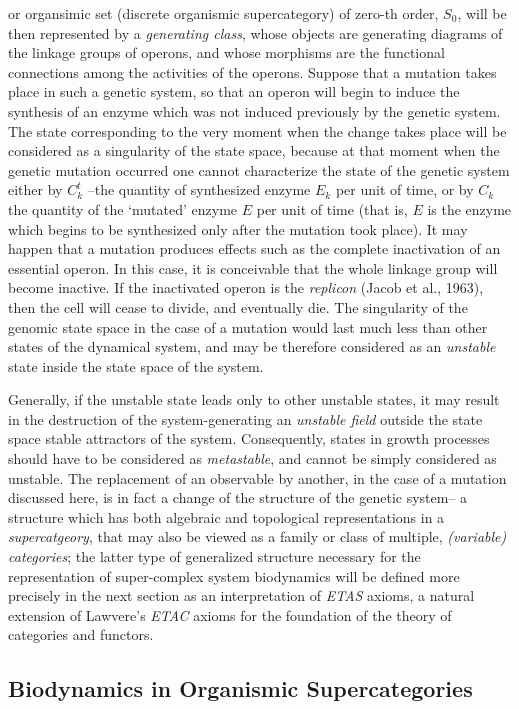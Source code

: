 \documentclass[12pt]{article}
\theoremstyle{plain}
\theoremstyle{definition}
\numberwithin{equation}{section}
\newcommand{\<}{{\langle}}
\begin{document}
or organsimic set (discrete organismic supercategory) of zero-th order, $S_0$, will be then represented by a \emph{generating class}, whose objects are generating diagrams of the linkage groups of operons, and whose morphisms are the functional connections among the activities of the operons. Suppose that a mutation takes place in such a genetic system, so that an operon will begin to induce the synthesis of an enzyme which was not induced previously by the genetic system. The state corresponding to the very moment when the change takes place will be considered as a singularity of the state space, because at that moment when the genetic mutation occurred one cannot characterize the state of the genetic system either by $C^t_k$ --the quantity of synthesized enzyme $E_k$ per unit of time, or by $C_k$ the quantity of the `mutated' enzyme $E$  per unit of time (that is, $E$  is the enzyme which begins to be synthesized only after the mutation took place). It may happen that a mutation produces effects such as the complete inactivation of an essential operon. In this case, it is conceivable that the whole linkage group will become inactive.  If the inactivated operon is the \emph{replicon} (Jacob et al., 1963), then the cell will cease to divide, and eventually die. The singularity of the genomic state space in the case of a mutation would last much less than other states of the dynamical system, and may be therefore considered as an \emph{unstable} state inside the state space of the system.

Generally, if the unstable state leads only to other unstable states, it may result in the destruction of the system-generating an \emph{unstable field} outside the state space stable attractors of the system. Consequently, states in growth processes should have to be considered as \emph{metastable}, and cannot be simply considered as unstable. The replacement of an observable by another, in the case of a mutation discussed here, is in fact a change of the structure of the genetic system-- a structure which has both algebraic and topological representations in a \emph{supercatgeory},
that may also be viewed as a family or class of multiple, \emph{(variable) categories}; the latter type of generalized structure necessary for the representation of super-complex system biodynamics will be defined more precisely in the
next section as an interpretation of \emph{ETAS} axioms, a natural extension of Lawvere's \emph{ETAC} axioms for the foundation of the theory of categories and functors. 


\subsection{Biodynamics in Organismic Supercategories} 
\end{document}
